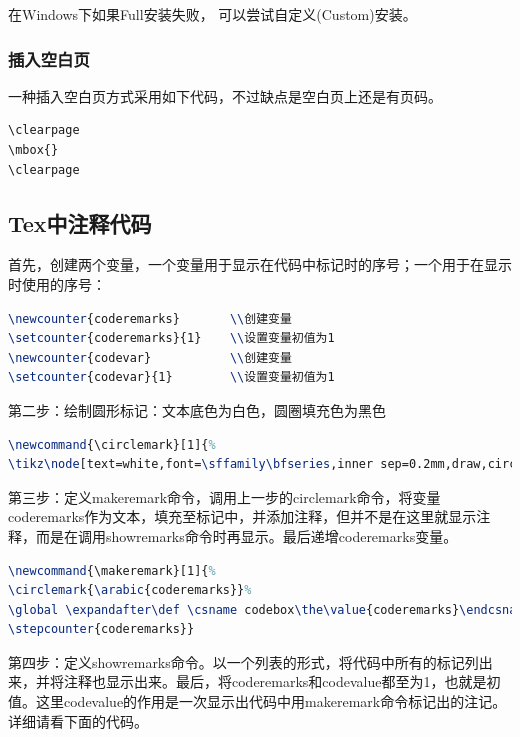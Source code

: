 \documentclass{book}
\newcounter{coderemarks}   %
\newcounter{codevar}     %
\newcommand{\circlemark}[1]{%
\tikz\node[text=white,font=\sffamily\bfseries,inner sep=0.2mm,draw,circle,fill=black]{#1};}
\newcommand{\makeremark}[1]{%
\circlemark{\arabic{coderemarks}}%
\global \expandafter\def \csname codebox\the\value{coderemarks}\endcsname{#1}%
\stepcounter{coderemarks}}
\begin{document}
在Windows下如果Full安装失败，
可以尝试自定义(Custom)安装。

\subsubsection{插入空白页}

一种插入空白页方式采用如下代码，不过缺点是空白页上还是有页码。

\begin{lstlisting}
\clearpage
\mbox{}         
\clearpage
\end{lstlisting}

\subsection{Tex中注释代码}

首先，创建两个变量，一个变量用于显示在代码中标记时的序号；一个用于在显示时使用的序号：

\begin{lstlisting}[language=TeX]
\newcounter{coderemarks}       \\创建变量
\setcounter{coderemarks}{1}    \\设置变量初值为1
\newcounter{codevar}           \\创建变量
\setcounter{codevar}{1}        \\设置变量初值为1
\end{lstlisting}

 

第二步：绘制圆形标记：文本底色为白色，圆圈填充色为黑色

\begin{lstlisting}[language=TeX]
\newcommand{\circlemark}[1]{%
\tikz\node[text=white,font=\sffamily\bfseries,inner sep=0.2mm,draw,circle,fill=black]{#1};}
\end{lstlisting} 

第三步：定义makeremark命令，调用上一步的circlemark命令，将变量coderemarks作为文本，填充至标记中，并添加注释，但并不是在这里就显示注释，而是在调用showremarks命令时再显示。最后递增coderemarks变量。

\begin{lstlisting}[language=TeX]
\newcommand{\makeremark}[1]{%
\circlemark{\arabic{coderemarks}}%
\global \expandafter\def \csname codebox\the\value{coderemarks}\endcsname{#1}%
\stepcounter{coderemarks}}
\end{lstlisting} 

第四步：定义showremarks命令。以一个列表的形式，将代码中所有的标记列出来，并将注释也显示出来。最后，将coderemarks和codevalue都至为1，也就是初值。这里codevalue的作用是一次显示出代码中用makeremark命令标记出的注记。详细请看下面的代码。
\end{document}
